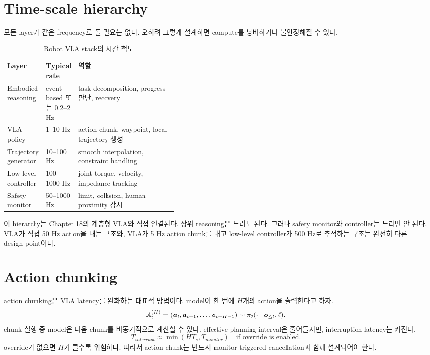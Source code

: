 \section{Time-scale hierarchy}

모든 layer가 같은 frequency로 돌 필요는 없다. 오히려 그렇게 설계하면 compute를 낭비하거나 불안정해질 수 있다.

\begin{table}[h]
  \centering
  \caption{Robot VLA stack의 시간 척도}
  \begin{tabularx}{\linewidth}{p{0.22\linewidth}p{0.18\linewidth}X}
    \toprule
    Layer & Typical rate & 역할 \\
    \midrule
    Embodied reasoning & event-based 또는 0.2--2 Hz & task decomposition, progress 판단, recovery \\
    VLA policy & 1--10 Hz & action chunk, waypoint, local trajectory 생성 \\
    Trajectory generator & 10--100 Hz & smooth interpolation, constraint handling \\
    Low-level controller & 100--1000 Hz & joint torque, velocity, impedance tracking \\
    Safety monitor & 50--1000 Hz & limit, collision, human proximity 감시 \\
    \bottomrule
  \end{tabularx}
  \label{tab:ch18-time-scale}
\end{table}

이 hierarchy는 Chapter 18의 계층형 VLA와 직접 연결된다. 상위 reasoning은 느려도 된다. 그러나 safety monitor와 controller는 느리면 안 된다. VLA가 직접 50 Hz action을 내는 구조와, VLA가 5 Hz action chunk를 내고 low-level controller가 500 Hz로 추적하는 구조는 완전히 다른 design point이다.

\section{Action chunking}

action chunking은 VLA latency를 완화하는 대표적 방법이다. model이 한 번에 $H$개의 action을 출력한다고 하자.
\begin{equation}
  A_t^{(H)}
  =
  (\bm{a}_t,\bm{a}_{t+1},\ldots,\bm{a}_{t+H-1})
  \sim
  \pi_{\theta}(\cdot \mid \bm{o}_{\leq t},\ell).
  \label{eq:ch18-action-chunk}
\end{equation}
chunk 실행 중 model은 다음 chunk를 비동기적으로 계산할 수 있다. effective planning interval은 줄어들지만, interruption latency는 커진다.
\begin{equation}
  T_{interrupt}
  \approx
  \min(H T_s, T_{monitor})
  \quad
  \text{if override is enabled}.
  \label{eq:ch18-interrupt}
\end{equation}
override가 없으면 $H$가 클수록 위험하다. 따라서 action chunk는 반드시 monitor-triggered cancellation과 함께 설계되어야 한다.

